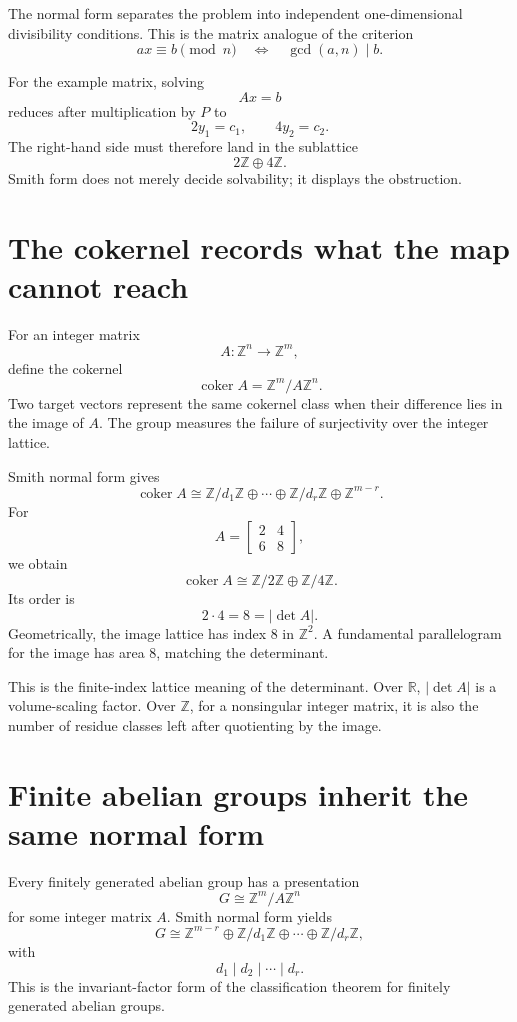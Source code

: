 The normal form separates the problem into independent one-dimensional divisibility conditions.  This is the matrix analogue of the criterion
\[
  ax\equiv b\pmod n
  \quad\Longleftrightarrow\quad
  \gcd(a,n)\mid b.
\]

For the example matrix, solving
\[
  Ax=b
\]
reduces after multiplication by \(P\) to
\[
  2y_1=c_1,
  \qquad
  4y_2=c_2.
\]
The right-hand side must therefore land in the sublattice
\[
  2\mathbb Z\oplus4\mathbb Z.
\]
Smith form does not merely decide solvability; it displays the obstruction.

\section{The cokernel records what the map cannot reach}

For an integer matrix
\[
  A:\mathbb Z^n\longrightarrow\mathbb Z^m,
\]
define the cokernel
\[
  \operatorname{coker}A
  =\mathbb Z^m/A\mathbb Z^n.
\]
Two target vectors represent the same cokernel class when their difference lies in the image of \(A\).  The group measures the failure of surjectivity over the integer lattice.

Smith normal form gives
\[
  \operatorname{coker}A
  \cong
  \mathbb Z/d_1\mathbb Z
  \oplus\cdots\oplus
  \mathbb Z/d_r\mathbb Z
  \oplus
  \mathbb Z^{m-r}.
\]
For
\[
  A=
  \begin{bmatrix}
    2&4\\
    6&8
  \end{bmatrix},
\]
we obtain
\[
  \operatorname{coker}A
  \cong
  \mathbb Z/2\mathbb Z
  \oplus
  \mathbb Z/4\mathbb Z.
\]
Its order is
\[
  2\cdot4=8=|\det A|.
\]
Geometrically, the image lattice has index \(8\) in \(\mathbb Z^2\).  A fundamental parallelogram for the image has area \(8\), matching the determinant.

This is the finite-index lattice meaning of the determinant.  Over \(\mathbb R\), \(|\det A|\) is a volume-scaling factor.  Over \(\mathbb Z\), for a nonsingular integer matrix, it is also the number of residue classes left after quotienting by the image.

\section{Finite abelian groups inherit the same normal form}

Every finitely generated abelian group has a presentation
\[
  G\cong\mathbb Z^m/A\mathbb Z^n
\]
for some integer matrix \(A\).  Smith normal form yields
\[
  G
  \cong
  \mathbb Z^{m-r}
  \oplus
  \mathbb Z/d_1\mathbb Z
  \oplus\cdots\oplus
  \mathbb Z/d_r\mathbb Z,
\]
with
\[
  d_1\mid d_2\mid\cdots\mid d_r.
\]
This is the invariant-factor form of the classification theorem for finitely generated abelian groups.

